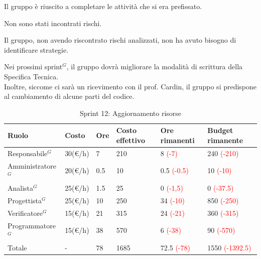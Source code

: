 Il gruppo è riuscito a completare le attività che si era prefissato.

Non sono stati incontrati rischi.

Il gruppo, non avendo riscontrato rischi analizzati, non ha avuto bisogno di identificare strategie.

Nei prossimi sprint$^G$, il gruppo dovrà migliorare la modalità di scrittura della Specifica Tecnica.\\
Inoltre, siccome ci sarà un ricevimento con il prof. Cardin, il gruppo si predispone al cambiamento di alcune parti del codice.

\begin{table}[H]
	\centering
	\begin{tabular}{|p{}|p{}|p{}|p{}|p{}|p{}|}
		\hline
		\rowcolor{gray!25}
		Ruolo & Costo & Ore & Costo \newline effettivo & Ore \newline rimanenti & Budget \newline rimanente \\ \hline
		
		Responsabile$^G$
		& 30(€/h) & 7 & 210
		& 8 \textcolor{red}{(-7)}
		& 240 \textcolor{red}{(-210)} \\ \hline
		
		Amministratore$^G$
		& 20(€/h) & 0.5 & 10
		& 0.5 \textcolor{red}{(-0.5)}
		& 10 \textcolor{red}{(-10)} \\ \hline
		
		Analista$^G$
		& 25(€/h) & 1.5 & 25
		& 0 \textcolor{red}{(-1,5)}
		& 0 \textcolor{red}{(-37.5)} \\ \hline
		
		Progettista$^G$
		& 25(€/h) & 10 & 250 
		& 34 \textcolor{red}{(-10)}
		& 850 \textcolor{red}{(-250)}\\ \hline
		
		Verificatore$^G$
		& 15(€/h) & 21 & 315
		& 24 \textcolor{red}{(-21)}
		& 360 \textcolor{red}{(-315)} \\ \hline
		
		Programmatore$^G$
		& 15(€/h) & 38 & 570
		& 6 \textcolor{red}{(-38)}
		& 90 \textcolor{red}{(-570)} \\ \hline
		
		Totale
		& - & 78 & 1685
		& 72.5 \textcolor{red}{(-78)}
		& 1550 \newline \textcolor{red}{(-1392.5)} \\ \hline
	\end{tabular}
	\caption{Sprint 12: Aggiornamento risorse}
\end{table}